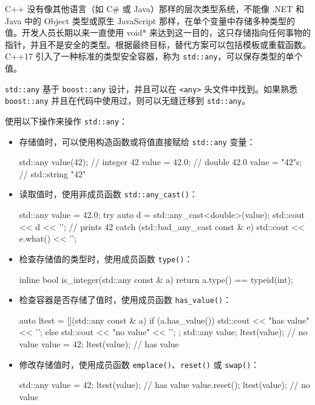 
C++ 没有像其他语言（如 C\# 或 Java）那样的层次类型系统，不能像 .NET 和 Java 中的 Object 类型或原生 JavaScript 那样，在单个变量中存储多种类型的值。开发人员长期以来一直使用 void* 来达到这一目的，这只存储指向任何事物的指针，并且不是安全的类型。根据最终目标，替代方案可以包括模板或重载函数。C++17 引入了一种标准的类型安全容器，称为 \verb|std::any|，可以保存类型的单个值。


\verb|std::any| 基于 \verb|boost::any| 设计，并且可以在 \verb|<any>| 头文件中找到。如果熟悉 \verb|boost::any| 并且在代码中使用过，则可以无缝迁移到 \verb|std::any|。


使用以下操作来操作 \verb|std::any|：

\begin{itemize}
\item
存储值时，可以使用构造函数或将值直接赋给 \verb|std::any| 变量：

\begin{cpp}
std::any value(42); // integer 42
value = 42.0;       // double 42.0
value = "42"s;      // std::string "42"
\end{cpp}

\item
读取值时，使用非成员函数 \verb|std::any_cast()|：

\begin{cpp}
std::any value = 42.0;
try
{
    auto d = std::any_cast<double>(value);
    std::cout << d << '\n'; // prints 42
}
catch (std::bad_any_cast const & e)
{
    std::cout << e.what() << '\n';
}
\end{cpp}

\item
检查存储值的类型时，使用成员函数 \verb|type()|：

\begin{cpp}
inline bool is_integer(std::any const & a)
{
    return a.type() == typeid(int);
}
\end{cpp}

\item
检查容器是否存储了值时，使用成员函数 \verb|has_value()|：

\begin{cpp}
auto ltest = [](std::any const & a) {
    if (a.has_value())
        std::cout << "has value" << '\n';
    else
        std::cout << "no value" << '\n';
};
std::any value;
ltest(value); // no value
value = 42;
ltest(value); // has value
\end{cpp}

\item
修改存储值时，使用成员函数 \verb|emplace()|、\verb|reset()| 或 \verb|swap()|：

\begin{cpp}
std::any value = 42;
ltest(value); // has value
value.reset();
ltest(value); // no value
\end{cpp}
\end{itemize}

